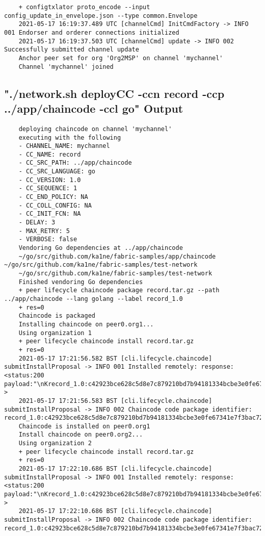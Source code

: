 \begin{lstlisting}
    + configtxlator proto_encode --input config_update_in_envelope.json --type common.Envelope
    2021-05-17 16:19:37.489 UTC [channelCmd] InitCmdFactory -> INFO 001 Endorser and orderer connections initialized
    2021-05-17 16:19:37.503 UTC [channelCmd] update -> INFO 002 Successfully submitted channel update
    Anchor peer set for org 'Org2MSP' on channel 'mychannel'
    Channel 'mychannel' joined
\end{lstlisting}

\subsection{"./network.sh deployCC -ccn record -ccp ../app/chaincode -ccl go" Output}
\begin{lstlisting}
    deploying chaincode on channel 'mychannel'
    executing with the following
    - CHANNEL_NAME: mychannel
    - CC_NAME: record
    - CC_SRC_PATH: ../app/chaincode
    - CC_SRC_LANGUAGE: go
    - CC_VERSION: 1.0
    - CC_SEQUENCE: 1
    - CC_END_POLICY: NA
    - CC_COLL_CONFIG: NA
    - CC_INIT_FCN: NA
    - DELAY: 3
    - MAX_RETRY: 5
    - VERBOSE: false
    Vendoring Go dependencies at ../app/chaincode
    ~/go/src/github.com/ka1ne/fabric-samples/app/chaincode ~/go/src/github.com/ka1ne/fabric-samples/test-network
    ~/go/src/github.com/ka1ne/fabric-samples/test-network
    Finished vendoring Go dependencies
    + peer lifecycle chaincode package record.tar.gz --path ../app/chaincode --lang golang --label record_1.0
    + res=0
    Chaincode is packaged
    Installing chaincode on peer0.org1...
    Using organization 1
    + peer lifecycle chaincode install record.tar.gz
    + res=0
    2021-05-17 17:21:56.582 BST [cli.lifecycle.chaincode] submitInstallProposal -> INFO 001 Installed remotely: response:<status:200 payload:"\nKrecord_1.0:c42923bce628c5d8e7c879210bd7b94181334bcbe3e0fe67341e7f3bac72d075\022\nrecord_1.0" >
    2021-05-17 17:21:56.583 BST [cli.lifecycle.chaincode] submitInstallProposal -> INFO 002 Chaincode code package identifier: record_1.0:c42923bce628c5d8e7c879210bd7b94181334bcbe3e0fe67341e7f3bac72d075
    Chaincode is installed on peer0.org1
    Install chaincode on peer0.org2...
    Using organization 2
    + peer lifecycle chaincode install record.tar.gz
    + res=0
    2021-05-17 17:22:10.686 BST [cli.lifecycle.chaincode] submitInstallProposal -> INFO 001 Installed remotely: response:<status:200 payload:"\nKrecord_1.0:c42923bce628c5d8e7c879210bd7b94181334bcbe3e0fe67341e7f3bac72d075\022\nrecord_1.0" >
    2021-05-17 17:22:10.686 BST [cli.lifecycle.chaincode] submitInstallProposal -> INFO 002 Chaincode code package identifier: record_1.0:c42923bce628c5d8e7c879210bd7b94181334bcbe3e0fe67341e7f3bac72d075

\end{lstlisting}

